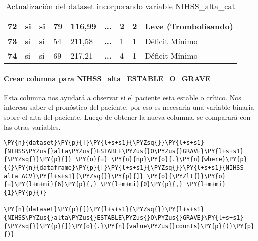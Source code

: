 \begin{table}[H]
{\begin{tabular}{|c|l|l|l|l|c|l|l|l|}
\textbf{72} & si & si & 79 & 116,99 & \textbf{...} & 2 & 2 & Leve (Trombolisando) \\ \hline
\textbf{73} & si & si & 54 & 211,58 & \textbf{...} & 1 & 1 & Déficit Mínimo \\ \hline
\textbf{74} & si & si & 69 & 217,21 & \textbf{...} & 4 & 1 & Déficit Mínimo \\ \hline
\end{tabular}%
}
\caption{Actualización del dataset incorporando variable NIHSS\_alta\_cat}
\label{tab:actualizcin nihss_alta_cat}
\end{table}
        
    \hypertarget{crear-columna-para-nihss_alta_estable_o_grave}{%
\paragraph{Crear columna para
NIHSS\_alta\_ESTABLE\_O\_GRAVE}\label{crear-columna-para-nihss_alta_estable_o_grave}}

Esta columna nos ayudará a observar si el paciente esta estable o
crítico. Nos interesa saber el pronóstico del paciente, por eso es
necesaria una variable binaria sobre el alta del paciente. Luego de
obtener la nueva columna, se comparará con las otras variables.

    \begin{tcolorbox}[breakable, size=fbox, boxrule=1pt, pad at break*=1mm,colback=cellbackground, colframe=cellborder]
\begin{Verbatim}[commandchars=\\\{\}]
\PY{n}{dataset}\PY{p}{[}\PY{l+s+s1}{\PYZsq{}}\PY{l+s+s1}{NIHSS\PYZus{}alta\PYZus{}ESTABLE\PYZus{}O\PYZus{}GRAVE}\PY{l+s+s1}{\PYZsq{}}\PY{p}{]} \PY{o}{=} \PY{n}{np}\PY{o}{.}\PY{n}{where}\PY{p}{(}\PY{n}{dataframe}\PY{p}{[}\PY{l+s+s1}{\PYZsq{}}\PY{l+s+s1}{NIHSS alta ACV}\PY{l+s+s1}{\PYZsq{}}\PY{p}{]} \PY{o}{\PYZlt{}}\PY{o}{=}\PY{l+m+mi}{6}\PY{p}{,} \PY{l+m+mi}{0}\PY{p}{,} \PY{l+m+mi}{1}\PY{p}{)}

\PY{n}{dataset}\PY{p}{[}\PY{l+s+s1}{\PYZsq{}}\PY{l+s+s1}{NIHSS\PYZus{}alta\PYZus{}ESTABLE\PYZus{}O\PYZus{}GRAVE}\PY{l+s+s1}{\PYZsq{}}\PY{p}{]}\PY{o}{.}\PY{n}{value\PYZus{}counts}\PY{p}{(}\PY{p}{)}
\end{Verbatim}
\end{tcolorbox}

\begin{table}[H]
\centering
\setlength{\tabcolsep}{5pt}
\caption{Clasificación binaria para la variable NIHSS\_alta\_:cat}
\label{tab:Nihss estable o grave}
\end{table}
        
